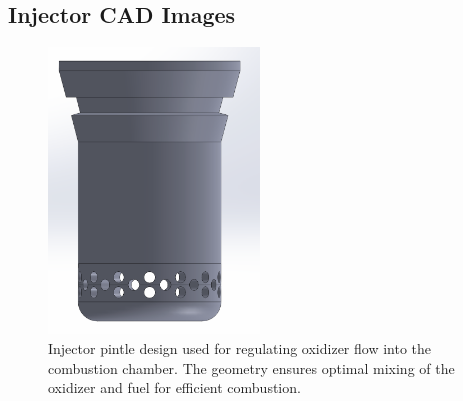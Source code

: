\subsection{Injector CAD Images}
\begin{figure}[H]
    \centering
    \includegraphics[width=0.5\textwidth]{Images/Pintle.png}
    \caption{Injector pintle design used for regulating oxidizer flow into the combustion chamber. The geometry ensures optimal mixing of the oxidizer and fuel for efficient combustion.}
    \label{fig:pintle}
\end{figure}





